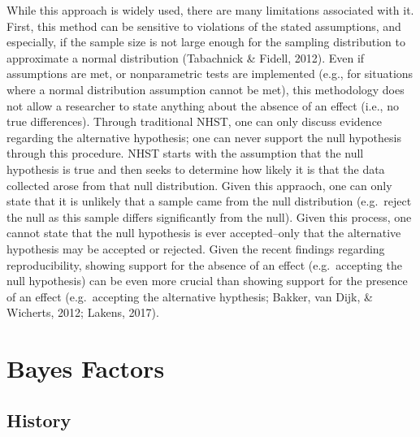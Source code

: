 \documentclass[,man, mask]{apa6}
\theoremstyle{definition}
\theoremstyle{definition}
\theoremstyle{definition}
\theoremstyle{remark}
\begin{document}
While this approach is widely used, there are many limitations
associated with it. First, this method can be sensitive to violations of
the stated assumptions, and especially, if the sample size is not large
enough for the sampling distribution to approximate a normal
distribution (Tabachnick \& Fidell, 2012). Even if assumptions are met,
or nonparametric tests are implemented (e.g., for situations where a
normal distribution assumption cannot be met), this methodology does not
allow a researcher to state anything about the absence of an effect
(i.e., no true differences). Through traditional NHST, one can only
discuss evidence regarding the alternative hypothesis; one can never
support the null hypothesis through this procedure. NHST starts with the
assumption that the null hypothesis is true and then seeks to determine
how likely it is that the data collected arose from that null
distribution. Given this appraoch, one can only state that it is
unlikely that a sample came from the null distribution (e.g.~reject the
null as this sample differs significantly from the null). Given this
process, one cannot state that the null hypothesis is ever
accepted--only that the alternative hypothesis may be accepted or
rejected. Given the recent findings regarding reproducibility, showing
support for the absence of an effect (e.g.~accepting the null
hypothesis) can be even more crucial than showing support for the
presence of an effect (e.g.~accepting the alternative hypthesis; Bakker,
van Dijk, \& Wicherts, 2012; Lakens, 2017).

\section{Bayes Factors}\label{bayes-factors}

\subsection{History}\label{history-1}
\end{document}
